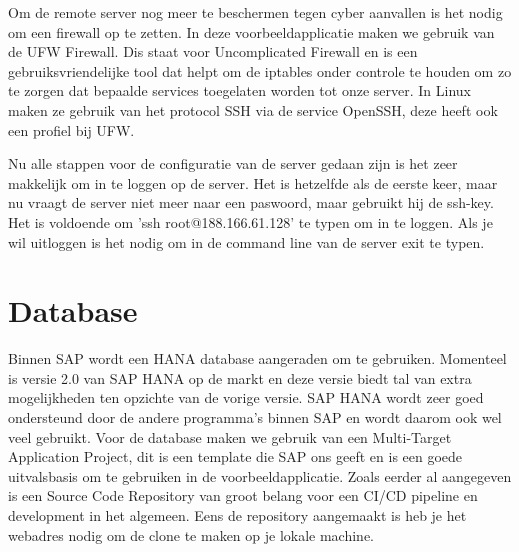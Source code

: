         Om de remote server nog meer te beschermen tegen cyber aanvallen is het nodig om een firewall op te zetten. In deze voorbeeldapplicatie maken we gebruik van de UFW Firewall. Dis staat voor Uncomplicated Firewall en is een gebruiksvriendelijke tool dat helpt om de iptables onder controle te houden om zo te zorgen dat bepaalde services toegelaten worden tot onze server.
        In Linux maken ze gebruik van het protocol SSH via de service OpenSSH, deze heeft ook een profiel bij UFW.
        
        Nu alle stappen voor de configuratie van de server gedaan zijn is het zeer makkelijk om in te loggen op de server.
        Het is hetzelfde als de eerste keer, maar nu vraagt de server niet meer naar een paswoord, maar gebruikt hij de ssh-key. Het is voldoende om 
        'ssh root@188.166.61.128' te typen om in te loggen.
        Als je wil uitloggen is het nodig om in de command line van de server exit te typen.
    
    \section{Database}
    \label{sec:database}
    Binnen SAP wordt een HANA database aangeraden om te gebruiken. Momenteel is versie 2.0 van SAP HANA op de markt en deze versie biedt tal van extra mogelijkheden ten opzichte van de vorige versie. SAP HANA wordt zeer goed ondersteund door de andere programma's binnen SAP en wordt daarom ook wel veel gebruikt.
    Voor de database maken we gebruik van een Multi-Target Application Project, dit is een template die SAP ons geeft en is een goede uitvalsbasis om te gebruiken in de voorbeeldapplicatie.
    Zoals eerder al aangegeven is een Source Code Repository van groot belang voor een CI/CD pipeline en development in het algemeen.
    Eens de repository aangemaakt is heb je het webadres nodig om de clone te maken op je lokale machine.
    
